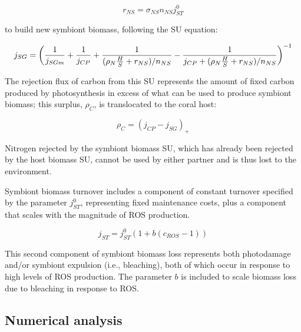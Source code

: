 \documentclass[]{elsarticle} %
\begin{document}
\begin{equation} r_{NS}=\sigma_{NS}n_{NS}j_{ST}^0 \end{equation}

to build new symbiont biomass, following the SU equation:

\begin{equation} j_{SG} = \bigg({1 \over j_{SGm}} + {1 \over j_{CP}} + {1 \over {(\rho_N{H \over S} + r_{NS}) / n_{NS}}} - {1 \over {j_{CP} + (\rho_N{H \over S} + r_{NS}) / n_{NS}}}\bigg)^{-1} \end{equation}

The rejection flux of carbon from this SU represents the amount of fixed
carbon produced by photosynthesis in excess of what can be used to
produce symbiont biomass; this surplus, \(\rho_C\), is translocated to
the coral host:

\begin{equation} \rho_C = (j_{CP} - j_{SG})_+ \end{equation}

Nitrogen rejected by the symbiont biomass SU, which has already been
rejected by the host biomass SU, cannot be used by either partner and is
thus lost to the environment.

Symbiont biomass turnover includes a component of constant turnover
specified by the parameter \(j_{ST}^0\), representing fixed maintenance
costs, plus a component that scales with the magnitude of ROS
production.

\begin{equation} j_{ST} = j_{ST}^0(1 + b(c_{ROS}-1)) \end{equation}

This second component of symbiont biomass loss represents both
photodamage and/or symbiont expulsion (i.e., bleaching), both of which
occur in response to high levels of ROS production. The parameter \(b\)
is included to scale biomass loss due to bleaching in response to ROS.

\subsection{Numerical analysis}\label{numerical-analysis}
\end{document}
